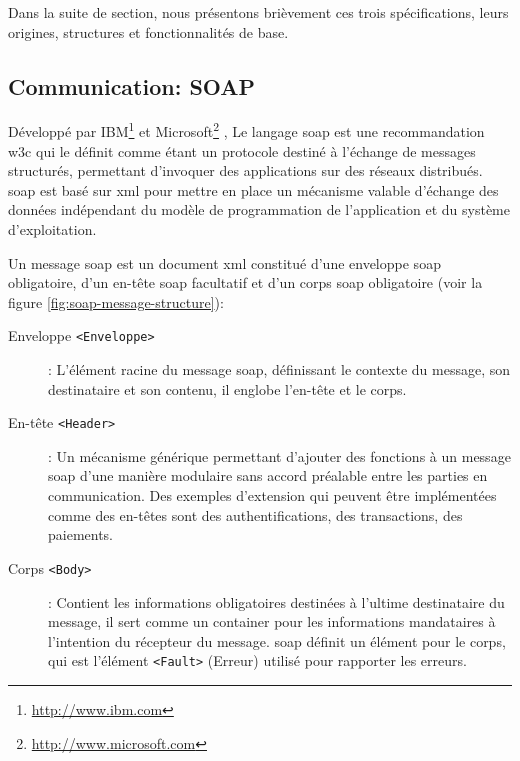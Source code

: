 

Dans la suite de section, nous présentons brièvement ces trois
spécifications, leurs origines, structures et fonctionnalités de base.

  \subsection{Communication: SOAP}
  \label{sec:soap}
  Développé par IBM\footnote{\url{http://www.ibm.com}} et
  Microsoft\footnote{\url{http://www.microsoft.com}}
  \cite{box2000simple}, Le langage \acrshort{soap} est une
  recommandation \acrshort{w3c} \cite{mitra2003soap} qui le définit
  comme étant un protocole destiné à l'échange de messages structurés,
  permettant d'invoquer des applications sur des réseaux
  distribués. \acrshort{soap} est basé sur \acrshort{xml} pour mettre
  en place un mécanisme valable d'échange des données indépendant du
  modèle de programmation de l'application et du système
  d'exploitation.\medskip

  Un message \acrshort{soap} est un document \acrshort{xml} constitué
  d'une enveloppe \acrshort{soap} obligatoire, d'un en-tête
  \acrshort{soap} facultatif et d'un corps \acrshort{soap} obligatoire
  (voir la figure \ref{fig:soap-message-structure}):

  

  \SpecialItem
  \renewcommand{\descriptionlabel}[1]{\hspace{1cm}\texttt{#1}}
  \begin{description}
  \item[Enveloppe \texttt{<Enveloppe>}]: L'élément racine du message
    \acrshort{soap}, définissant le contexte du message, son
    destinataire et son contenu, il englobe l'en-tête et le corps.

  \item[En-tête \texttt{<Header>}]: Un mécanisme générique permettant
    d'ajouter des fonctions à un message \acrshort{soap} d'une manière
    modulaire sans accord préalable entre les parties en
    communication.  Des exemples d'extension qui peuvent être
    implémentées comme des en-têtes sont des authentifications, des
    transactions, des paiements.

  \item[Corps \texttt{<Body>}]: Contient les informations obligatoires
    destinées à l'ultime destinataire du message, il sert comme un
    container pour les informations mandataires à l'intention du
    récepteur du message. \acrshort{soap} définit un élément pour le
    corps, qui est l'élément \texttt{<Fault>} (Erreur) utilisé pour
    rapporter les erreurs.
  \end{description}
  \enddescription

